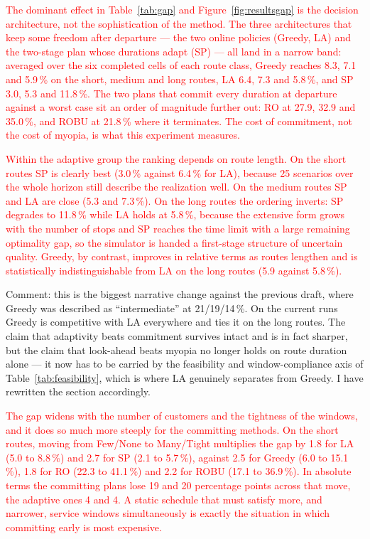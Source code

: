 \documentclass[preprint,12pt,3p]{elsarticle}
\newcommand{\red}[1]{\textcolor{red}{#1}}
\newcommand{\green}[1]{{\color{darkgreen}#1}}
\begin{document}
\red{The dominant effect in Table~\ref{tab:gap} and Figure~\ref{fig:resultsgap}
is the decision architecture, not the sophistication of the method. The three
architectures that keep some freedom after departure --- the two online policies
(Greedy, LA) and the two-stage plan whose durations adapt (SP) --- all land in a
narrow band: averaged over the six completed cells of each route class, Greedy
reaches 8.3, 7.1 and 5.9\,\% on the short, medium and long routes, LA 6.4, 7.3
and 5.8\,\%, and SP 3.0, 5.3 and 11.8\,\%. The two plans that commit every
duration at departure against a worst case sit an order of magnitude further
out: RO at 27.9, 32.9 and 35.0\,\%, and ROBU at 21.8\,\% where it terminates.
The cost of commitment, not the cost of myopia, is what this experiment
measures.}

\red{Within the adaptive group the ranking depends on route length. On the short
routes SP is clearly best (3.0\,\% against 6.4\,\% for LA), because 25 scenarios
over the whole horizon still describe the realization well. On the medium routes
SP and LA are close (5.3 and 7.3\,\%). On the long routes the ordering inverts:
SP degrades to 11.8\,\% while LA holds at 5.8\,\%, because the extensive form
grows with the number of stops and SP reaches the time limit with a large
remaining optimality gap, so the simulator is handed a first-stage structure of
uncertain quality. Greedy, by contrast, improves in relative terms as routes
lengthen and is statistically indistinguishable from LA on the long routes (5.9
against 5.8\,\%).}

\green{Comment: this is the biggest narrative change against the previous draft,
where Greedy was described as ``intermediate'' at 21/19/14\,\%. On the current
runs Greedy is competitive with LA everywhere and ties it on the long routes.
The claim that adaptivity beats commitment survives intact and is in fact
sharper, but the claim that look-ahead beats myopia no longer holds on
route duration alone --- it now has to be carried by the feasibility and
window-compliance axis of Table~\ref{tab:feasibility}, which is where LA
genuinely separates from Greedy. I have rewritten the section accordingly.}

\red{The gap widens with the number of customers and the tightness of the
windows, and it does so much more steeply for the committing methods. On the
short routes, moving from Few/None to Many/Tight multiplies the gap by 1.8 for
LA (5.0 to 8.8\,\%) and 2.7 for SP (2.1 to 5.7\,\%), against 2.5 for Greedy (6.0
to 15.1\,\%), 1.8 for RO (22.3 to 41.1\,\%) and 2.2 for ROBU (17.1 to
36.9\,\%). In absolute terms the committing plans lose 19 and 20 percentage
points across that move, the adaptive ones 4 and 4. A static schedule that must
satisfy more, and narrower, service windows simultaneously is exactly the
situation in which committing early is most expensive.}
\end{document}
